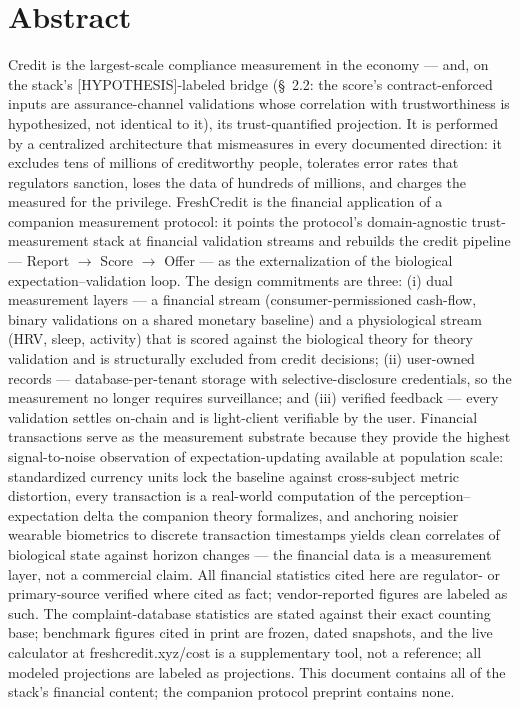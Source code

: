 \documentclass[
]{article}
\author{}
\date{}
\newcounter{none} %
\begin{document}
\section{Abstract}\label{abstract}

Credit is the largest-scale compliance measurement in the economy ---
and, on the stack's {[}HYPOTHESIS{]}-labeled bridge (§~2.2: the score's
contract-enforced inputs are assurance-channel validations whose
correlation with trustworthiness is hypothesized, not identical to it),
its trust-quantified projection. It is performed by a centralized
architecture that mismeasures in every documented direction: it excludes
tens of millions of creditworthy people, tolerates error rates that
regulators sanction, loses the data of hundreds of millions, and charges
the measured for the privilege. FreshCredit is the financial application
of a companion measurement protocol: it points the protocol's
domain-agnostic trust-measurement stack at financial validation streams
and rebuilds the credit pipeline --- Report \(\rightarrow\) Score
\(\rightarrow\) Offer --- as the externalization of the biological
expectation--validation loop. The design commitments are three: (i) dual
measurement layers --- a financial stream (consumer-permissioned
cash-flow, binary validations on a shared monetary baseline) and a
physiological stream (HRV, sleep, activity) that is scored against the
biological theory for theory validation and is structurally excluded
from credit decisions; (ii) user-owned records --- database-per-tenant
storage with selective-disclosure credentials, so the measurement no
longer requires surveillance; and (iii) verified feedback --- every
validation settles on-chain and is light-client verifiable by the user.
Financial transactions serve as the measurement substrate because they
provide the highest signal-to-noise observation of expectation-updating
available at population scale: standardized currency units lock the
baseline against cross-subject metric distortion, every transaction is a
real-world computation of the perception--expectation delta the
companion theory formalizes, and anchoring noisier wearable biometrics
to discrete transaction timestamps yields clean correlates of biological
state against horizon changes --- the financial data is a measurement
layer, not a commercial claim. All financial statistics cited here are
regulator- or primary-source verified where cited as fact;
vendor-reported figures are labeled as such. The complaint-database
statistics are stated against their exact counting base; benchmark
figures cited in print are frozen, dated snapshots, and the live
calculator at freshcredit.xyz/cost is a supplementary tool, not a
reference; all modeled projections are labeled as projections. This
document contains all of the stack's financial content; the companion
protocol preprint contains none.
\end{document}
